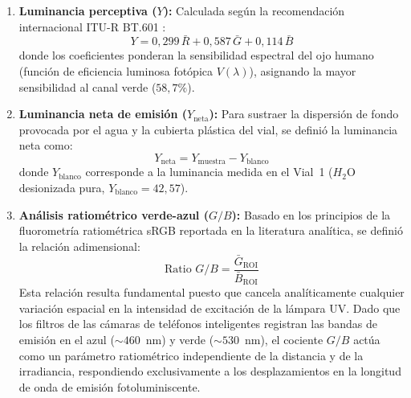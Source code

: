 \begin{enumerate}[label=\alph*)]
    \item \textbf{Luminancia perceptiva ($Y$):} Calculada según la recomendación internacional ITU-R BT.601 \cite{poynton2012digital}:
    \begin{equation}
        Y = 0{,}299\,\bar{R} + 0{,}587\,\bar{G} + 0{,}114\,\bar{B}
        \label{eq:luminancia}
    \end{equation}
    donde los coeficientes ponderan la sensibilidad espectral del ojo humano (función de eficiencia luminosa fotópica $V(\lambda)$), asignando la mayor sensibilidad al canal verde ($58{,}7\%$).

    \item \textbf{Luminancia neta de emisión ($Y_{\text{neta}}$):} Para sustraer la dispersión de fondo provocada por el agua y la cubierta plástica del vial, se definió la luminancia neta como:
    \begin{equation}
        Y_{\text{neta}} = Y_{\text{muestra}} - Y_{\text{blanco}}
        \label{eq:luminancia_neta}
    \end{equation}
    donde $Y_{\text{blanco}}$ corresponde a la luminancia medida en el Vial~1 ($H_2\text{O}$ desionizada pura, $Y_{\text{blanco}} = 42{,}57$).

    \item \textbf{Análisis ratiométrico verde-azul ($G/B$):} Basado en los principios de la fluorometría ratiométrica sRGB reportada en la literatura analítica, se definió la relación adimensional:
    \begin{equation}
        \text{Ratio } G/B = \frac{\bar{G}_{\text{ROI}}}{\bar{B}_{\text{ROI}}}
        \label{eq:ratio_gb}
    \end{equation}
    Esta relación resulta fundamental puesto que cancela analíticamente cualquier variación espacial en la intensidad de excitación de la lámpara UV. Dado que los filtros de las cámaras de teléfonos inteligentes registran las bandas de emisión en el azul ($\sim 460$~nm) y verde ($\sim 530$~nm), el cociente $G/B$ actúa como un parámetro ratiométrico independiente de la distancia y de la irradiancia, respondiendo exclusivamente a los desplazamientos en la longitud de onda de emisión fotoluminiscente.
\end{enumerate}


